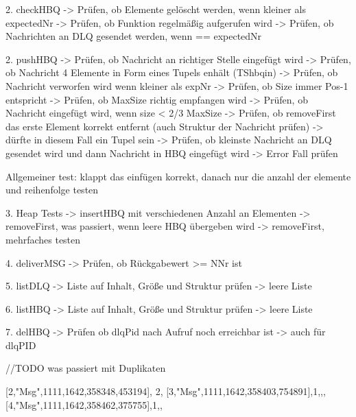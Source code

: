 2. checkHBQ
-> Prüfen, ob Elemente gelöscht werden, wenn kleiner als expectedNr
-> Prüfen, ob Funktion regelmäßig aufgerufen wird 
-> Prüfen, ob Nachrichten an DLQ gesendet werden, wenn == expectedNr

2. pushHBQ
-> Prüfen, ob Nachricht an richtiger Stelle eingefügt wird 
-> Prüfen, ob Nachricht 4 Elemente in Form eines Tupels enhält (TShbqin)
-> Prüfen, ob Nachricht verworfen wird wenn kleiner als expNr 
-> Prüfen, ob Size immer Pos-1 entspricht 
-> Prüfen, ob MaxSize richtig empfangen wird 
-> Prüfen, ob Nachricht eingefügt wird, wenn size < 2/3 MaxSize
-> Prüfen, ob removeFirst das erste Element korrekt entfernt (auch Struktur der Nachricht prüfen)
    -> dürfte in diesem Fall ein Tupel sein 
-> Prüfen, ob kleinste Nachricht an DLQ gesendet wird und dann Nachricht in HBQ eingefügt wird 
-> Error Fall prüfen

Allgemeiner test: klappt das einfügen korrekt, danach nur die anzahl der elemente und reihenfolge testen 

3. Heap Tests 
-> insertHBQ mit verschiedenen Anzahl an Elementen
-> removeFirst, was passiert, wenn leere HBQ übergeben wird 
-> removeFirst, mehrfaches testen

4. deliverMSG
-> Prüfen, ob Rückgabewert >= NNr ist

5. listDLQ
-> Liste auf Inhalt, Größe und Struktur prüfen
-> leere Liste 

6. listHBQ
-> Liste auf Inhalt, Größe und Struktur prüfen
-> leere Liste 

7. delHBQ
-> Prüfen ob dlqPid nach Aufruf noch erreichbar ist 
-> auch für dlqPID

//TODO was passiert mit Duplikaten

{[2,"Msg",1111,{1642,358348,453194}], 2,
       {[3,"Msg",1111,{1642,358403,754891}],1,{},{}},
       {[4,"Msg",1111,{1642,358462,375755}],1,{},{}}}

